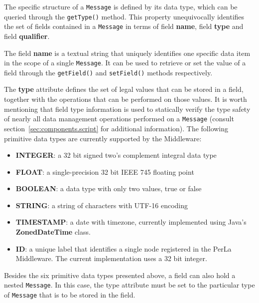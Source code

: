 The specific structure of a \texttt{Message} is defined by its data type, which
can be queried through the \texttt{getType()} method. This property
unequivocally identifies the set of fields contained in a \texttt{Message} in
terms of field \textbf{name}, field \textbf{type} and field \textbf{qualifier}.

The field \textbf{name} is a textual string that uniquely identifies one
specific data item in the scope of a single \texttt{Message}. It can be used to
retrieve or set the value of a field through the \texttt{getField()} and
\texttt{setField()} methods respectively.

The \textbf{type} attribute defines the set of legal values that can be stored
in a field, together with the operations that can be performed on those values.
It is worth mentioning that field type information is used to statically verify
the type safety of nearly all data management operations performed on a
\texttt{Message} (consult section~\ref{sec:components.script} for additional
information). The following primitive data types are currently supported by the
Middleware:
\begin{itemize}
  \item \textbf{INTEGER}: a 32 bit signed two's complement integral data type
  \item \textbf{FLOAT}: a single-precision 32 bit IEEE 745 floating point
  \item \textbf{BOOLEAN}: a data type with only two values, true or false
  \item \textbf{STRING}: a string of characters with UTF-16 encoding
  \item \textbf{TIMESTAMP}: a date with timezone, currently implemented using
  Java's \textbf{ZonedDateTime} class.
  \item \textbf{ID}: a unique label that identifies a single node registered
  in the PerLa Middleware. The current implementation uses a 32 bit integer. 
\end{itemize}
Besides the six primitive data types presented above, a field can also hold a
nested \texttt{Message}. In this case, the type attribute must be set to the
particular type of \texttt{Message} that is to be stored in the field. 

